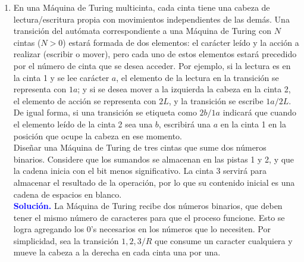 \documentclass[11pt]{article}
\newcommand{\solution}{\textcolor{blue}{\textbf{Solución. }}}
\begin{document}
\begin{enumerate}
    \item En una Máquina de Turing multicinta, cada cinta tiene una cabeza de lectura/escritura propia con movimientos independientes de las demás. Una transición del autómata correspondiente a una Máquina de Turing con $N$ cintas ($N>0$) estará formada de dos elementos: el carácter leído y la acción a realizar (escribir o mover), pero cada uno de estos elementos estará precedido por el número de cinta que se desea acceder. Por ejemplo, si la lectura es en la cinta 1 y se lee carácter $a$, el elemento de la lectura en la transición se representa con $1a$; y si se desea mover a la izquierda la cabeza en la cinta 2, el elemento de acción se representa con $2L$, y la transición se escribe $1a/2L$. De igual forma, si una transición se etiqueta como $2b/1a$ indicará que cuando el elemento leído de la cinta 2 sea una $b$, escribirá una $a$ en la cinta 1 en la posición que ocupe la cabeza en ese momento. \vspace{3mm} \\ 
    Diseñar una Máquina de Turing de tres cintas que sume dos números binarios. Considere que los sumandos se almacenan en las pistas 1 y 2, y que la cadena inicia con el bit menos significativo. La cinta 3 servirá para almacenar el resultado de la operación, por lo que su contenido inicial es una cadena de espacios en blanco. \vspace{3mm} \\
    \solution La Máquina de Turing recibe dos números binarios, que deben tener el mismo número de caracteres para que el proceso funcione. Esto se logra agregando los 0's necesarios en los números que lo necesiten. Por simplicidad, sea la transición $1,2,3/R$ que consume un caracter cualquiera y mueve la cabeza a la derecha en cada cinta una por una.
    \begin{center} {\small
        }
\end{center}
\end{enumerate}
\end{document}
